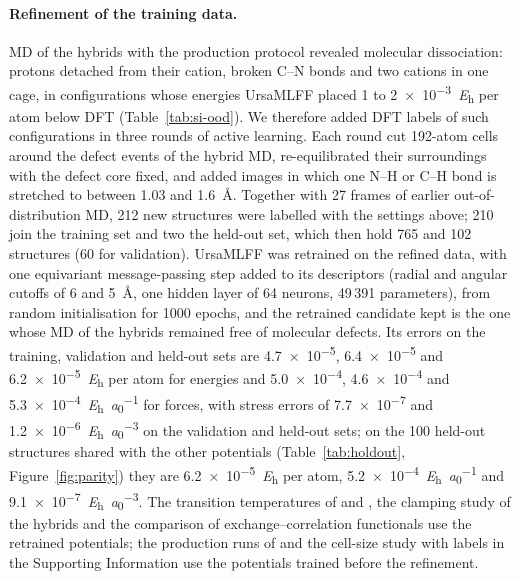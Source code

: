 {\paragraph{Refinement of the training data.}
MD of the hybrids with the production protocol revealed molecular dissociation: protons detached from
their cation, broken C--N bonds and two cations in one cage, in configurations whose energies UrsaMLFF
placed 1 to \SI{2e-3}{\hartree} per atom below DFT (Table~\ref{tab:si-ood}). We therefore added DFT
labels of such configurations in three rounds of active learning. Each round cut 192-atom cells around
the defect events of the hybrid MD, re-equilibrated their surroundings with the defect core fixed, and
added images in which one N--H or C--H bond is stretched to between 1.03 and \SI{1.6}{\angstrom}.
Together with 27 frames of earlier out-of-distribution MD, 212 new structures were labelled with the
settings above; 210 join the training set and two the held-out set, which then hold 765 and 102
structures (60 for validation). UrsaMLFF was retrained on the refined data, with one equivariant
message-passing step added to its descriptors (radial and angular cutoffs of 6 and \SI{5}{\angstrom},
one hidden layer of 64 neurons, 49\,391 parameters), from random initialisation for 1000 epochs, and
the retrained candidate kept is the one whose MD of the hybrids remained free of molecular defects.
Its errors on the training, validation and held-out sets are \SI{4.7e-5}{}, \SI{6.4e-5}{} and
\SI{6.2e-5}{\hartree} per atom for energies and \SI{5.0e-4}{}, \SI{4.6e-4}{} and
\SI{5.3e-4}{\hartree\per\bohr} for forces, with stress errors of \SI{7.7e-7}{} and
\SI{1.2e-6}{\hartree\per\bohr\cubed} on the validation and held-out sets; on the 100 held-out structures
shared with the other potentials (Table~\ref{tab:holdout}, Figure~\ref{fig:parity}) they are
\SI{6.2e-5}{\hartree} per atom, \SI{5.2e-4}{\hartree\per\bohr} and \SI{9.1e-7}{\hartree\per\bohr\cubed}.
 The transition temperatures of \MASnI{} and \FASnI{},
the clamping study of the hybrids and the comparison of exchange--correlation functionals use the
retrained potentials; the production runs of \CsSnI{} and the cell-size study with \rSCAN{} labels in the
Supporting Information use the potentials trained before the refinement.
}

